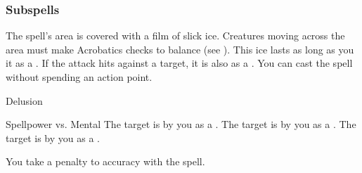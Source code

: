 \subsubsection{Subspells}
The spell's area is covered with a film of slick ice.
Creatures moving across the area must make Acrobatics checks to balance (see ).
This ice lasts as long as you  it as a .
If the attack hits against a target, it is also  as a .
You can cast the spell without spending an action point.
\begin{spellsection}{Delusion}
\begin{spellheader}
\end{spellheader}
\begin{spellcontent}
\begin{spelltargetinginfo}
\end{spelltargetinginfo}
\begin{spelleffects}
\begin{spellattack}{Spellpower vs. Mental}
\spellsuccess The target is \frightened by you as a .
\spellcritical The target is \panicked by you as a .
\spellfailure The target is \shaken by you as a .
\end{spellattack}
\end{spelleffects}
\end{spellcontent}
\begin{spellfooter}
\end{spellfooter}
\begin{spellsubcontent}
\begin{spellcantrip}
You take a  penalty to accuracy with the spell.
\end{spellcantrip}
\end{spellsubcontent}
\end{spellsection}
